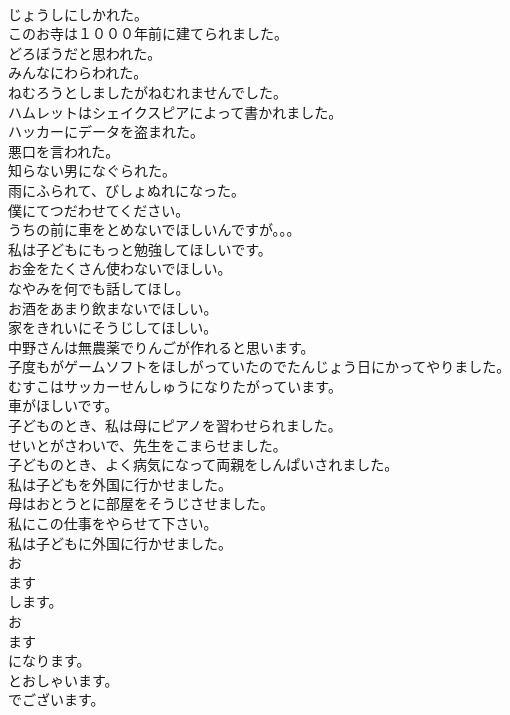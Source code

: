 \documentclass[8pt]{extreport}
\begin{document}
\begin{CJK}{UTF8}{min}
\\	じょうしにしかれた。
\\	このお寺は１０００年前に建てられました。
\\	どろぼうだと思われた。
\\	みんなにわらわれた。
\\	ねむろうとしましたがねむれませんでした。
\\	ハムレットはシェイクスピアによって書かれました。
\\	ハッカーにデータを盗まれた。
\\	悪口を言われた。
\\	知らない男になぐられた。
\\	雨にふられて、びしょぬれになった。
\\	僕にてつだわせてください。
\\	うちの前に車をとめないでほしいんですが。。。
\\	私は子どもにもっと勉強してほしいです。
\\	お金をたくさん使わないでほしい。
\\	なやみを何でも話してほし。
\\	お酒をあまり飲まないでほしい。
\\	家をきれいにそうじしてほしい。
\\	中野さんは無農薬でりんごが作れると思います。
\\	子度もがゲームソフトをほしがっていたのでたんじょう日にかってやりました。
\\	むすこはサッカーせんしゅうになりたがっています。
\\	車がほしいです。
\\	子どものとき、私は母にピアノを習わせられました。
\\	せいとがさわいで、先生をこまらせました。
\\	子どものとき、よく病気になって両親をしんぱいされました。
\\	私は子どもを外国に行かせました。
\\	母はおとうとに部屋をそうじさせました。
\\	私にこの仕事をやらせて下さい。
\\	私は子どもに外国に行かせました。
\\	お
\\	ます
\\	します。
\\	お
\\	ます
\\	になります。
\\	とおしゃいます。
\\	でございます。

\end{CJK}
\end{document}
